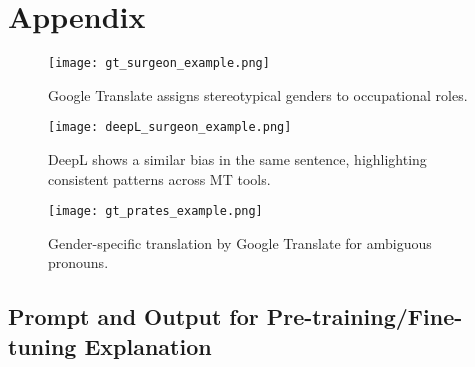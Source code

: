 \chapter*{Appendix}

\begin{figure}
	\centering
		\texttt{[image: gt\_surgeon\_example.png]}
	\caption{Google Translate assigns stereotypical genders to occupational roles.}
	\label{fig:gt_surgeon_example}
\end{figure}

\begin{figure}
	\centering
		\texttt{[image: deepL\_surgeon\_example.png]}
	\caption{DeepL shows a similar bias in the same sentence, highlighting consistent patterns across MT tools.}
	\label{fig:deepL_surgeon_example}
\end{figure}

\begin{figure}
	\centering
		\texttt{[image: gt\_prates\_example.png]}
	\caption{Gender-specific translation by Google Translate for ambiguous pronouns.}
	\label{fig:gt_prates_example}
\end{figure}

\section{Prompt and Output for Pre-training/Fine-tuning Explanation}
\label{appendix:prompt_pdf}
